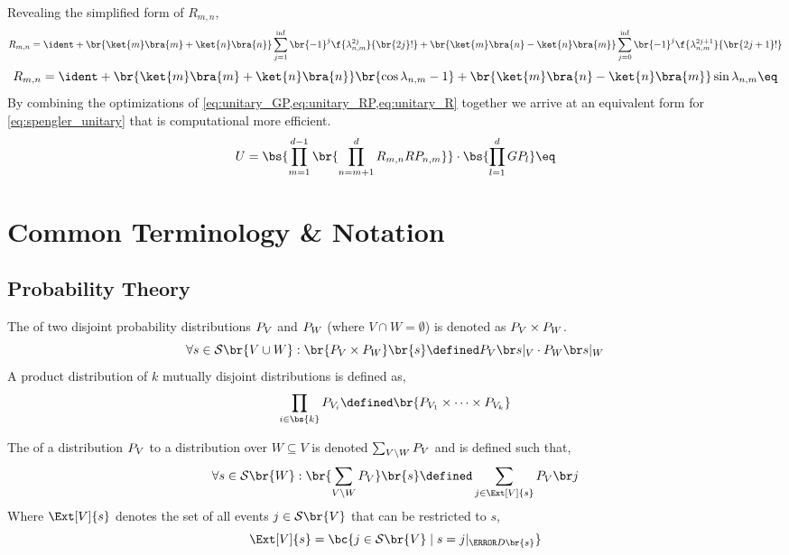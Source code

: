 \documentclass[aps, 10pt, english, twoside, pra, nofootinbib, tightenlines, longbibliography, superscriptaddress]{revtex4-1}
\renewcommand{\Events}[1]{\mathcal{S}\br{#1}} %
\begin{document}
    Revealing the simplified form of $R_{m,n}$,
    \[ R_{m,n} = \ident + \br{\ket{m}\bra{m} + \ket{n}\bra{n}} \sum_{j=1}^{\inf} \br{-1}^j\f{\lambda_{n,m}^{2j}}{\br{2j}!} + \br{\ket{m}\bra{n} - \ket{n}\bra{m}} \sum_{j=0}^{\inf} \br{-1}^j\f{\lambda_{n,m}^{2j+1}}{\br{2j+1}!} \]
    \[ R_{m,n} = \ident + \br{\ket{m}\bra{m} + \ket{n}\bra{n}} \br{\cos\lambda_{n,m} - 1} + \br{\ket{m}\bra{n} - \ket{n}\bra{m}} \sin\lambda_{n,m} \eq \label{eq:unitary_R} \]
    By combining the optimizations of \cref{eq:unitary_GP,eq:unitary_RP,eq:unitary_R} together we arrive at an equivalent form for \cref{eq:spengler_unitary} that is computational more efficient.
    \[ U = \bs{\prod_{m=1}^{d-1} \br{\prod_{n=m+1}^{d} R_{m,n}RP_{n,m}}} \cdot \bs{\prod_{l=1}^{d} GP_{l}}  \eq \label{eq:spengler_unitary_fast} \]


    \section{Common Terminology \& Notation}

    \subsection{Probability Theory}
    \label{sec:probability_theory}

    \begin{definition}
        The  of two disjoint probability distributions $\prob[V]$ and $\prob[W]$ (where $V \cap W = \emptyset$) is denoted as $\prob[V] \times \prob[W]$.
        \[ \forall s \in \Events{V \cup W} : \br{\prob[V] \times \prob[W]}\br{s} \defined \prob[V][s|_{V}]\cdot\prob[W][s|_{W}] \]
        A product distribution of $k$ mutually disjoint distributions is defined as,
        \[ \prod_{i\in\bs{k}} \prob[V_i] \defined \br{\prob[V_1] \times \cdots \times \prob[V_k]} \]
    \end{definition}

    \begin{definition}
        The  of a distribution $\prob[V]$ to a distribution over $W \subseteq V$ is denoted $\sum_{V \setminus W} \prob[V]$ and is defined such that,
        \[ \forall s \in \Events{W} : \br{\sum_{V \setminus W} \prob[V]}\br{s} \defined \sum_{j \in \Ext[V]{s}} \prob[V][j] \]
        Where $\Ext[V]{s}$ denotes the set of all events $j \in \Events{V}$ that can be restricted to $s$,
        \[ \Ext[V]{s} = \bc{j \in \Events{V} \mid s = j|_{\s{D}\br{s}}} \]
    \end{definition}
\end{document}
